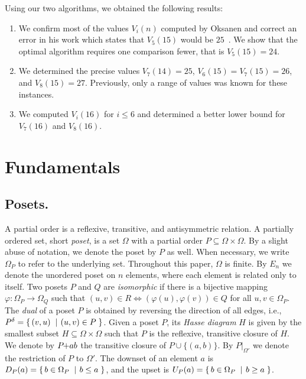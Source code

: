 \documentclass[a4paper,UKenglish,cleveref, autoref, thm-restate]{lipics-v2021}
\makeatletter
\newcommand{\set}[2]{\left\{\, \mathinner{#1}\vphantom{#2}\: \left|\: \vphantom{#1}\mathinner{#2} \right.\,\right\}}
\newcommand\ie{i.e\@., }
\newcommand{\sse}{\subseteq}
\newcommand{\pchild}[3]{{#1}\kern-1pt{+}{#2}{#3}}
\newcommand{\dual}[1]{{#1}^{\delta}}
\newcommand{\less}[2]{D_{#1}(#2)}
\newcommand{\greater}[2]{U_{#1}(#2)}
\makeatother
\begin{document}
Using our two algorithms, we obtained the following results:
\begin{enumerate}
  \item We confirm most of the values $V_i(n)$ computed by Oksanen and correct an error in his work which states that $V_5(15)$ would be $25$~\cite{Oksanen}.
        We show that the optimal algorithm requires one comparison fewer, that is $V_5(15) = 24$.
  \item We determined the precise values $V_7(14) = 25$, $V_6(15) = V_7(15) = 26$, and $V_8(15) = 27$.
        Previously, only a range of values was known for these instances.
  \item We computed $V_i(16)$ for $i \leq 6$ and determined a better lower bound for $V_7(16)$ and $V_8(16)$.
\end{enumerate}


\section{Fundamentals}

\subsection{Posets.}
A partial order is a reflexive, transitive, and antisymmetric relation.
A partially ordered set, short \emph{poset}, is a set $\Omega$ with a partial order $P \subseteq \Omega \times \Omega$.
By a slight abuse of notation, we denote the poset by $P$ as well.
When necessary, we write $\Omega_P$ to refer to the underlying set.
Throughout this paper, $\Omega$ is finite.
By $E_n$ we denote the unordered poset on $n$ elements, where each element is related only to itself.
Two posets $P$ and $Q$ are \emph{isomorphic} if there is a bijective mapping $\varphi: \Omega_P \to \Omega_Q$ such that $(u, v) \in R \iff (\varphi(u), \varphi(v)) \in Q$ for all $u, v \in \Omega_P$.
The \emph{dual} of a poset $P$ is obtained by reversing the direction of all edges, \ie $\dual{P} = \set{(v,u)}{(u,v) \in P}$.
Given a poset $P$, its \emph{Hasse diagram} $H$ is given by the smallest subset $H \sse \Omega \times \Omega$ such that $P$ is the reflexive, transitive closure of $H$.
We denote by $\pchild{P}{a}{b}$ the transitive closure of $P \cup \{(a, b)\}$.
By $P|_{\Omega'}$ we denote the restriction of $P$ to $\Omega'$.
The downset of an element $a$ is $\less{P}{a} = \set{b \in \Omega_P}{b \le a}$, and the upset is $\greater{P}{a} = \set{b \in \Omega_P}{b \ge a}$.
\end{document}
